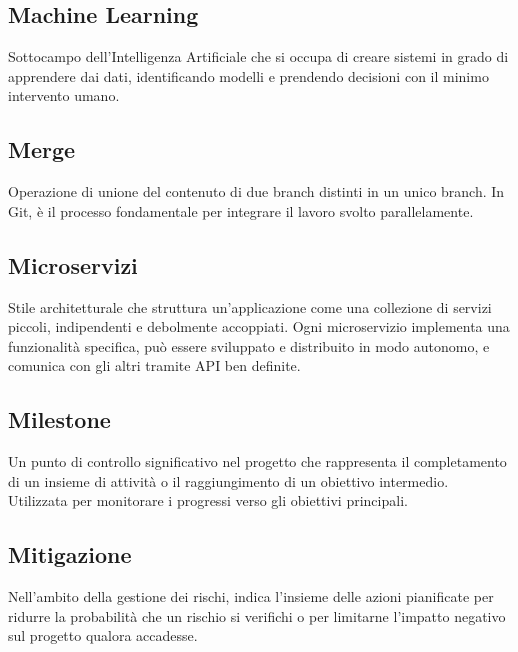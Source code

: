 \documentclass[a4paper, 11pt, oneside]{scrartcl} %
\begin{document}

\subsection*{Machine Learning}
Sottocampo dell'Intelligenza Artificiale che si occupa di creare sistemi in grado di apprendere dai dati, identificando modelli e prendendo decisioni con il minimo intervento umano.
\vspace{0.5cm}

\subsection*{Merge}
Operazione di unione del contenuto di due branch distinti in un unico branch. In Git, è il processo fondamentale per integrare il lavoro svolto parallelamente.
\vspace{0.5cm}

\subsection*{Microservizi}
Stile architetturale che struttura un'applicazione come una collezione di servizi piccoli, indipendenti e debolmente accoppiati. Ogni microservizio implementa una funzionalità specifica, può essere sviluppato e distribuito in modo autonomo, e comunica con gli altri tramite API ben definite.
\vspace{0.5cm}

\subsection*{Milestone}
Un punto di controllo significativo nel progetto che rappresenta il completamento di un insieme di attività o il raggiungimento di un obiettivo intermedio. Utilizzata per monitorare i progressi verso gli obiettivi principali.
\vspace{0.5cm}

\subsection*{Mitigazione}
Nell'ambito della gestione dei rischi, indica l'insieme delle azioni pianificate per ridurre la probabilità che un rischio si verifichi o per limitarne l'impatto negativo sul progetto qualora accadesse.
\vspace{0.5cm}
\end{document}
